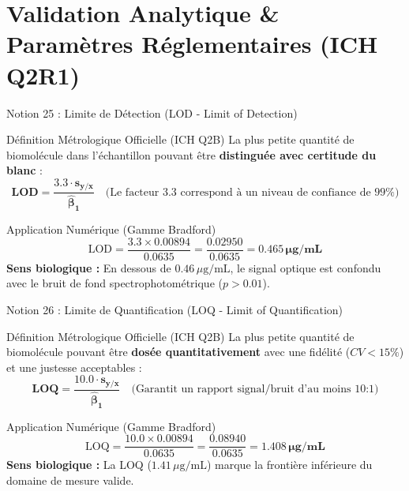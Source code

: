\documentclass[aspectratio=169,10pt]{beamer}
\begin{document}
\section{Validation Analytique \& Paramètres Réglementaires (ICH Q2R1)}

\begin{frame}{Notion 25 : Limite de Détection (LOD - Limit of Detection)}
  \begin{conceptbox}{Définition Métrologique Officielle (ICH Q2B)}
    \footnotesize
    La plus petite quantité de biomolécule dans l'échantillon pouvant être \textbf{distinguée avec certitude du blanc} :
    \begin{equation*}
      \mathbf{\text{LOD} = \frac{3.3 \cdot s_{y/x}}{\hat{\beta}_1}} \quad \text{(Le facteur 3.3 correspond à un niveau de confiance de 99\%)}
    \end{equation*}
  \end{conceptbox}
  \vspace{1mm}
  \begin{biobox}{Application Numérique (Gamme Bradford)}
    \footnotesize
    \begin{equation*}
      \text{LOD} = \frac{3.3 \times 0.00894}{0.0635} = \frac{0.02950}{0.0635} = \mathbf{0.465\,\mu\text{g/mL}}
    \end{equation*}
    \textbf{Sens biologique :}
    En dessous de $0.46\,\mu\text{g/mL}$, le signal optique est confondu avec le bruit de fond spectrophotométrique ($p > 0.01$).
  \end{biobox}
\end{frame}

\begin{frame}{Notion 26 : Limite de Quantification (LOQ - Limit of Quantification)}
  \begin{conceptbox}{Définition Métrologique Officielle (ICH Q2B)}
    \footnotesize
    La plus petite quantité de biomolécule pouvant être \textbf{dosée quantitativement} avec une fidélité ($CV < 15\%$) et une justesse acceptables :
    \begin{equation*}
      \mathbf{\text{LOQ} = \frac{10.0 \cdot s_{y/x}}{\hat{\beta}_1}} \quad \text{(Garantit un rapport signal/bruit d'au moins 10:1)}
    \end{equation*}
  \end{conceptbox}
  \vspace{1mm}
  \begin{biobox}{Application Numérique (Gamme Bradford)}
    \footnotesize
    \begin{equation*}
      \text{LOQ} = \frac{10.0 \times 0.00894}{0.0635} = \frac{0.08940}{0.0635} = \mathbf{1.408\,\mu\text{g/mL}}
    \end{equation*}
    \textbf{Sens biologique :}
    La LOQ ($1.41\,\mu\text{g/mL}$) marque la frontière inférieure du domaine de mesure valide.
  \end{biobox}
\end{frame}
\end{document}
